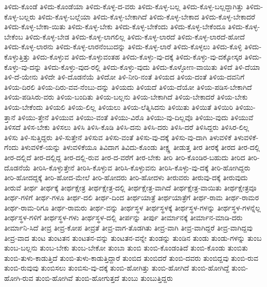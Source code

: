 {ತಿಳಿದು-ಕೊಂಡೆ
ತಿಳಿದು-ಕೊಂಡೆಯಾ
ತಿಳಿದು-ಕೊಳ್ಳ-ದ-ವರು
ತಿಳಿದು-ಕೊಳ್ಳ-ಬಲ್ಲ
ತಿಳಿದು-ಕೊಳ್ಳ-ಬಲ್ಲದ್ದಾಗಿತ್ತು
ತಿಳಿದು-ಕೊಳ್ಳ-ಬಲ್ಲರು
ತಿಳಿದು-ಕೊಳ್ಳ-ಬಲ್ಲೆಯಾ
ತಿಳಿದು-ಕೊಳ್ಳ-ಬೇಕಾಗಿದೆ
ತಿಳಿದು-ಕೊಳ್ಳ-ಬೇಕಾದ
ತಿಳಿದು-ಕೊಳ್ಳ-ಬೇಕಾದರೆ
ತಿಳಿದು-ಕೊಳ್ಳ-ಬೇಕಾ-ಯಿತು
ತಿಳಿದು-ಕೊಳ್ಳ-ಬೇಕು
ತಿಳಿದು-ಕೊಳ್ಳ-ಬೇಕೆಂದು
ತಿಳಿದು-ಕೊಳ್ಳ-ಬೇಕೆಂದೂ
ತಿಳಿದು-ಕೊಳ್ಳ-ಬೇಕೆಂಬ
ತಿಳಿದು-ಕೊಳ್ಳ-ಬೇಡ
ತಿಳಿದು-ಕೊಳ್ಳ-ಲಾಗಲಿಲ್ಲ
ತಿಳಿದು-ಕೊಳ್ಳ-ಲಾರದೆ
ತಿಳಿದು-ಕೊಳ್ಳ-ಲಾರದೆ-ಹೋದೆ
ತಿಳಿದು-ಕೊಳ್ಳ-ಲಾರನು
ತಿಳಿದು-ಕೊಳ್ಳ-ಲಾರನೆಂಬುದನ್ನು
ತಿಳಿದು-ಕೊಳ್ಳ-ಲಾರೆ
ತಿಳಿದು-ಕೊಳ್ಳಲು
ತಿಳಿದು-ಕೊಳ್ಳಿ
ತಿಳಿದು-ಕೊಳ್ಳುತ್ತಿತ್ತು
ತಿಳಿದು-ಕೊಳ್ಳುವ
ತಿಳಿದು-ಕೊಳ್ಳುವಂತಹ
ತಿಳಿದು-ಕೊಳ್ಳು-ವು-ದಕ್ಕೆ
ತಿಳಿದು-ಕೊಳ್ಳು-ವು-ದಕ್ಕೋಸ್ಕರ
ತಿಳಿದು-ಕೊಳ್ಳು-ವು-ದನ್ನು
ತಿಳಿದು-ಕೊಳ್ಳು-ವುದ-ರಲ್ಲಿ
ತಿಳಿದು-ಕೊಳ್ಳು-ವುದು
ತಿಳಿದು-ಕೊಳ್ಳೋಣ-ವಾಯಿತು
ತಿಳಿದೆ
ತಿಳಿ-ದೆಯಾ
ತಿಳಿ-ದೆ-ಯೇನು
ತಿಳಿದೇ
ತಿಳಿ-ದೊಡನೆಯೆ
ತಿಳಿದೋ
ತಿಳಿ-ನೀರಿ-ನಂತೆ
ತಿಳಿಯದ
ತಿಳಿಯ-ದಂತೆ
ತಿಳಿಯ-ದವನಿಗೆ
ತಿಳಿಯ-ದಿರಲಿ
ತಿಳಿಯ-ದಿರು-ವವ-ನೆಂಬು-ದನ್ನು
ತಿಳಿಯದು
ತಿಳಿಯದೆ
ತಿಳಿಯ-ದೆಯೋ
ತಿಳಿಯ-ಪಡಿಸ-ಬೇಕಾಗಿದೆ
ತಿಳಿಯ-ಪಡಿಸಿರು-ವರು
ತಿಳಿಯ-ಬಂದಿತು
ತಿಳಿಯ-ಬಲ್ಲನು
ತಿಳಿಯ-ಬೇಕಾಗಿದೆ
ತಿಳಿಯ-ಬೇಕಾದರೆ
ತಿಳಿಯ-ಬೇಕು
ತಿಳಿಯ-ಬೇಕೆಂದು
ತಿಳಿಯಲಿ
ತಿಳಿಯ-ಲಿಲ್ಲ
ತಿಳಿಯಲು
ತಿಳಿಯ-ಲೆತ್ನಿಸಿದನು
ತಿಳಿಯಿತು
ತಿಳಿಯಿತೆ
ತಿಳಿಯಿರಿ
ತಿಳಿಯು-ತ್ತಾನೆ
ತಿಳಿಯು-ತ್ತೇನೆ
ತಿಳಿಯುವ
ತಿಳಿಯು-ವಂತೆ
ತಿಳಿಯು-ವಿರೊ
ತಿಳಿಯು-ವು-ದಿಲ್ಲವೊ
ತಿಳಿಯು-ವುದು
ತಿಳಿಯುವೆ
ತಿಳಿಸದೆ
ತಿಳಿಸ-ಬೇಕು
ತಿಳಿಸಲು
ತಿಳಿಸಿ
ತಿಳಿಸಿ-ಕೊಡಿ
ತಿಳಿಸಿ-ದನು
ತಿಳಿಸಿ-ದರು
ತಿಳಿಸಿ-ದರೆ
ತಿಳಿಸಿದ್ದರು
ತಿಳಿಸಿರ-ಲಿಲ್ಲ
ತಿಳಿಸು
ತಿಳಿ-ಸುತ್ತಿದ್ದರು
ತಿಳಿ-ಸುತ್ತೇನೆ
ತಿಳಿಸುವ
ತಿಳಿಸು-ವಂತೆ
ತಿಳಿಸು-ವು-ದಕ್ಕೆ
ತಿಳಿಸು-ವು-ದಾಗಿ
ತಿಳುವಳಿಕೆ
ತಿಳುವಳಿಕೆ-ಗೆಂದು
ತಿಳುವಳಿಕೆ-ಯನ್ನು
ತಿಳುವಳಿಕೆಯೂ
ತಿವಿದಾಗ
ತಿವಿದು-ಕೊಂಡು
ತೀಕ್ಷ್ಣ
ತೀಡುತ್ತ
ತೀರ
ತೀರಕ್ಕೆ
ತೀರದ
ತೀರ-ದಲ್ಲಿ
ತೀರ-ದಲ್ಲಿದೆ
ತೀರ-ದಲ್ಲಿದ್ದ
ತೀರ-ದಲ್ಲಿ-ರುವ
ತೀರ-ದ-ವರೆಗೆ
ತೀರ-ಬೇಕು
ತೀರಿ
ತೀರಿ-ಕೊಂಡಿರ-ಬಹುದು
ತೀರಿದ
ತೀರಿ-ದೊಡನೆಯೆ
ತೀರಿಸಿ-ಕೊಳ್ಳುತ್ತೇನೆ
ತೀರಿಸಿ-ಕೊಳ್ಳುವ
ತೀರಿಸಿ-ಕೊಳ್ಳುವನು
ತೀರಿಸಿ-ಕೊಳ್ಳು-ವು-ದಕ್ಕೆ
ತೀರಿ-ಹೋಗಿದ್ದರು
ತೀರಿ-ಹೋದದ್ದಕ್ಕೆ
ತೀರಿ-ಹೋದ-ಮೇಲೆ
ತೀರಿ-ಹೋದರು
ತೀರಿ-ಹೋದಳು
ತೀರುವರು
ತೀರುವು-ದಕ್ಕೆ
ತೀರುವುದು
ತೀರುವೆ
ತೀರ್ಥ
ತೀರ್ಥಕ್ಕೆ
ತೀರ್ಥಕ್ಷೇತ್ರ
ತೀರ್ಥಕ್ಷೇತ್ರ-ದಲ್ಲಿ
ತೀರ್ಥಕ್ಷೇತ್ರ-ವಾಗಿದೆ
ತೀರ್ಥಕ್ಷೇತ್ರ-ವಾಯಿತು
ತೀರ್ಥಕ್ಷೇತ್ರವೂ
ತೀರ್ಥ-ಗಳಿಗೆ
ತೀರ್ಥ-ಗಳೂ
ತೀರ್ಥ-ದಲಿ
ತೀರ್ಥ-ದಿಂದ
ತೀರ್ಥಯಾತ್ರೆ
ತೀರ್ಥಯಾತ್ರೆಗೆ
ತೀರ್ಥ-ರಾಮ
ತೀರ್ಥ-ರಾಮರ
ತೀರ್ಥ-ರಾಮ-ರಿಗೂ
ತೀರ್ಥ-ರಾಮರು
ತೀರ್ಥ-ವನ್ನು
ತೀರ್ಥಸ್ಥಳ
ತೀರ್ಥಸ್ಥಳಕ್ಕೆ
ತೀರ್ಥಸ್ಥಳ-ಗಳನ್ನು
ತೀರ್ಥಸ್ಥಳ-ಗಳನ್ನೆಲ್ಲ
ತೀರ್ಥಸ್ಥಳ-ಗಳಿಗೆ
ತೀರ್ಥಸ್ಥಳ-ಗಳು
ತೀರ್ಥಸ್ಥಳ-ದಲ್ಲಿ
ತೀರ್ಪನ್ನು
ತೀರ್ಪು
ತೀರ್ಮಾನಕ್ಕೆ
ತೀರ್ಮಾನ-ಮಾಡಿ-ದರು
ತೀರ್ಮಾನಿ-ಸಿದೆ
ತೀವ್ರ
ತೀವ್ರ-ಕೋಪ
ತೀವ್ರತೆ
ತೀವ್ರ-ವಾಗ-ತೊಡಗಿತು
ತೀವ್ರ-ವಾಗಿ
ತೀವ್ರ-ವಾಗಿದ್ದರೆ
ತೀವ್ರ-ವಾಗಿದ್ದವು
ತೀವ್ರ-ವಾದ
ತುಂಟ
ತುಂಟತನ
ತುಂಟತನ-ವನ್ನು
ತುಂಟತನ-ವನ್ನೇ
ತುಂಡನ್ನು
ತುಂಡಿನ
ತುಂಡು
ತುಂಡು-ಗಳನ್ನು
ತುಂಬ
ತುಂಬ-ಬಲ್ಲನು
ತುಂಬ-ಬೇಕು
ತುಂಬ-ಬೇಕೋ
ತುಂಬಾ
ತುಂಬಿ
ತುಂಬಿ-ಕೊಂಡಂತಿದೆ
ತುಂಬಿ-ಕೊಂಡು
ತುಂಬಿತು
ತುಂಬಿ-ತುಳು-ಕಾಡುತ್ತಿದೆ
ತುಂಬಿ-ತುಳು-ಕಾಡುತ್ತಿದ್ದಾರೆ
ತುಂಬಿದ
ತುಂಬಿದರೆ
ತುಂಬಿ-ದವರು
ತುಂಬಿದ್ದವು
ತುಂಬಿ-ರುವ
ತುಂಬಿ-ರುವುವು
ತುಂಬಿಸಲು
ತುಂಬಿಸು-ವು-ದಕ್ಕೆ
ತುಂಬಿ-ಹೋಗಿತ್ತು
ತುಂಬಿ-ಹೋಗಿದೆ
ತುಂಬಿ-ಹೋಗಿದ್ದೆ
ತುಂಬಿ-ಹೋಗಿ-ರುವ
ತುಂಬಿ-ಹೋಗಿವೆ
ತುಂಬಿ-ಹೋಗುತ್ತದೆ
ತುಂಬು
ತುಂಬುತ್ತಿದ್ದರು
}
